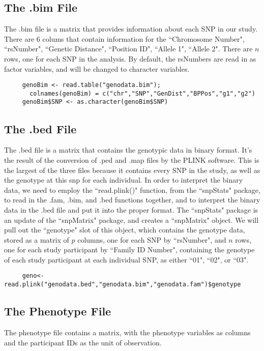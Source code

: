 \documentclass{ar2e}
\begin{document}
\subsection*{The .bim File}
The .bim file is a matrix that provides information about each SNP in our study.  There are 6 colums that contain information for the ``Chromosome Number", ``rsNumber", ``Genetic Distance", ``Position ID", ``Allele 1", ``Allele 2".  There are $n$ rows, one for each SNP in the analysis.  By default, the rsNumbers are read in as factor variables, and will be changed to character variables.
\begin{verbatim}
     genoBim <- read.table("genodata.bim");
       colnames(genoBim) = c("chr","SNP","GenDist","BPPos","g1","g2")
     genoBim$SNP <- as.character(genoBim$SNP)
\end{verbatim}
\subsection*{The .bed File}
The .bed file is a matrix that contains the genotypic data in binary format. It's the result of the conversion of .ped and .map files by the PLINK software. This is the largest of the three files because it contains every SNP in the study, as well as the genotype at this snp for each individual. In order to interpret the binary data, we need to employ the ``read.plink()" function, from the ``snpStats" package, to read in the .fam, .bim, and .bed functions together, and to interpret the binary data in the .bed file and put it into the proper format. The  ``snpStats" package is an update of the ``snpMatrix" package, and creates a ``snpMatrix" object.  We will pull out the ``genotype" slot of this object, which contains the genotype data, stored as a matrix of $p$ columns, one for each SNP by ``rsNumber", and $n$ rows, one for each study participant by ``Family ID Number", containing the genotype of each study participant at each individual SNP, as either ``01", ``02", or ``03".

\begin{samepage}
\begin{verbatim}
     geno<-read.plink("genodata.bed","genodata.bim","genodata.fam")$genotype
\end{verbatim}
\end{samepage}

\subsection*{The Phenotype File}
The phenotype file contains a matrix, with the phenotype variables as columns and the participant IDs as the unit of observation.
\end{document}
